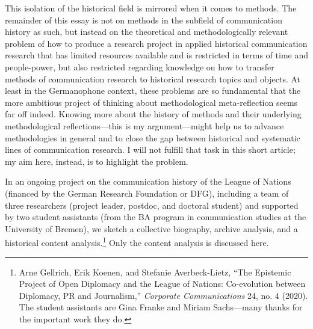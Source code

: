 \documentclass{tufte-handout}
\begin{document}
This isolation of the historical field is mirrored when it comes to
methods. The remainder of this essay is not on methods in the subfield
of communication history as such, but instead on the theoretical and
methodologically relevant problem of how to produce a research project
in applied historical communication research that has limited resources
available and is restricted in terms of time and people-power, but also
restricted regarding knowledge on how to transfer methods of
communication research to historical research topics and objects. At
least in the Germanophone context, these problems are so fundamental
that the more ambitious project of thinking about methodological
meta-reflection seems far off indeed. Knowing more about the history of
methods and their underlying methodological reflections---this is my
argument---might help us to advance methodologies in general and to
close the gap between historical and systematic lines of communication
research. I will not fulfill that task in this short article; my aim
here, instead, is to highlight the problem.

In an ongoing project on the communication history of the League of
Nations (financed by the German Research Foundation or DFG), including a
team of three researchers (project leader, postdoc, and doctoral
student) and supported by two student assistants (from the BA program in
communication studies at the University of Bremen), we sketch a
collective biography, archive analysis, and a historical content
analysis.\footnote{Arne Gellrich, Erik Koenen, and Stefanie
  Averbeck-Lietz, ``The Epistemic Project of Open Diplomacy and the
  League of Nations: Co-evolution between Diplomacy, PR and
  Journalism,'' \emph{Corporate Communications} 24, no. 4 (2020). The
  student assistants are Gina Franke and Miriam Sachs---many thanks for
  the important work they do.} Only the content analysis is discussed
here.
\end{document}
